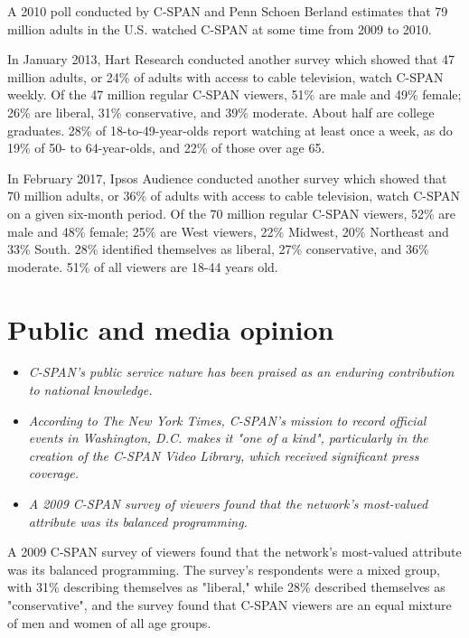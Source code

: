 A 2010 poll conducted by C-SPAN and Penn Schoen Berland estimates that
79 million adults in the U.S. watched C-SPAN at some time from 2009 to
2010.

In January 2013, Hart Research conducted another survey which showed
that 47 million adults, or 24\% of adults with access to cable
television, watch C-SPAN weekly. Of the 47 million regular C-SPAN
viewers, 51\% are male and 49\% female; 26\% are liberal, 31\%
conservative, and 39\% moderate. About half are college graduates. 28\%
of 18-to-49-year-olds report watching at least once a week, as do 19\%
of 50- to 64-year-olds, and 22\% of those over age 65.

In February 2017, Ipsos Audience conducted another survey which showed
that 70 million adults, or 36\% of adults with access to cable
television, watch C-SPAN on a given six-month period. Of the 70 million
regular C-SPAN viewers, 52\% are male and 48\% female; 25\% are West
viewers, 22\% Midwest, 20\% Northeast and 33\% South. 28\% identified
themselves as liberal, 27\% conservative, and 36\% moderate. 51\% of all
viewers are 18-44 years old.

\section{Public and media opinion}\label{public-and-media-opinion}

\begin{itemize}
\item
  \emph{C-SPAN's public service nature has been praised as an enduring
  contribution to national knowledge.}
\item
  \emph{According to The New York Times, C-SPAN's mission to record
  official events in Washington, D.C. makes it "one of a kind",
  particularly in the creation of the C-SPAN Video Library, which
  received significant press coverage.}
\item
  \emph{A 2009 C-SPAN survey of viewers found that the network's
  most-valued attribute was its balanced programming.}
\end{itemize}

A 2009 C-SPAN survey of viewers found that the network's most-valued
attribute was its balanced programming. The survey's respondents were a
mixed group, with 31\% describing themselves as "liberal," while 28\%
described themselves as "conservative", and the survey found that C-SPAN
viewers are an equal mixture of men and women of all age groups.

